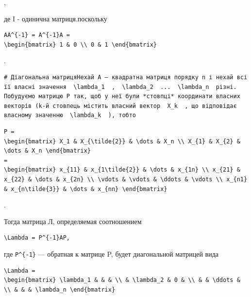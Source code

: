 \documentclass[
  ukrainian,
]{article}
\begin{document}
,

де I - одинична матриця.поскольку

\begin{verbatim}
AA^{-1} = A^{-1}A =
\begin{bmatrix} 1 & 0 \\ 0 & 1 \end{bmatrix}
\end{verbatim}

.

\begin{verbatim}
# Діагональна матрицяНехай A — квадратна матриця порядку n і нехай всі її власні значення  \lambda_1  ,  \lambda_2  ...  \lambda_n  різні. Побудуємо матрицю P так, щоб у неї були *стовпці* координати власних векторів (k-й стовпець містить власний вектор  X_k  , що відповідає власному значенню  \lambda_k  ), тобто
\end{verbatim}

\begin{verbatim}
P =
\begin{bmatrix} X_1 & X_{\tilde{2}} & \dots & X_n \\ X_{1} & X_{2} & \dots & X_n \end{bmatrix}
=
\begin{bmatrix} x_{11} & x_{1\tilde{2}} & \dots & x_{1n} \\ x_{21} & x_{22} & \dots & x_{2n} \\ \vdots & \vdots & \ddots & \vdots \\ x_{n1} & x_{n\tilde{3}} & \dots & x_{nn} \end{bmatrix}
\end{verbatim}

.

Тогда матрица Л, определяемая соотношением

\begin{verbatim}
\Lambda = P^{-1}AP,
\end{verbatim}

где \texttt{P\^{}\{-1\}} --- обратная к матрице P, будет диагональной
матрицей вида

\begin{verbatim}
\Lambda =
\begin{bmatrix} \lambda_1 & & & \\ & \lambda_2 & 0 & \\ & & \ddots & \\ & & & \lambda_n \end{bmatrix}
\end{verbatim}
\end{document}
